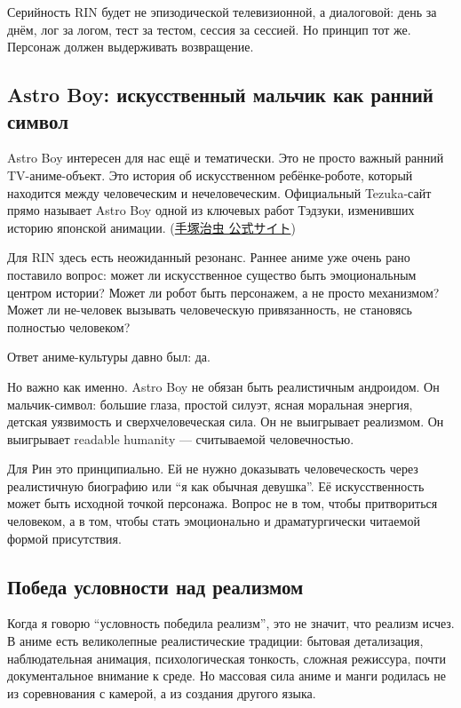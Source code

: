 Серийность RIN будет не эпизодической телевизионной, а диалоговой: день
за днём, лог за логом, тест за тестом, сессия за сессией. Но принцип тот
же. Персонаж должен выдерживать возвращение.

\subsection*{Astro Boy: искусственный мальчик как ранний символ}

Astro Boy интересен для нас ещё и тематически. Это не просто важный
ранний TV-аниме-объект. Это история об искусственном ребёнке-роботе,
который находится между человеческим и нечеловеческим. Официальный
Tezuka-сайт прямо называет Astro Boy одной из ключевых работ Тэдзуки,
изменивших историю японской анимации.
(\href{https://tezukaosamu.net/en/anime/30.html?utm_source=chatgpt.com}{手塚治虫
公式サイト})

Для RIN здесь есть неожиданный резонанс. Раннее аниме уже очень рано
поставило вопрос: может ли искусственное существо быть эмоциональным
центром истории? Может ли робот быть персонажем, а не просто механизмом?
Может ли не-человек вызывать человеческую привязанность, не становясь
полностью человеком?

Ответ аниме-культуры давно был: да.

Но важно как именно. Astro Boy не обязан быть реалистичным андроидом. Он
мальчик-символ: большие глаза, простой силуэт, ясная моральная энергия,
детская уязвимость и сверхчеловеческая сила. Он не выигрывает реализмом.
Он выигрывает readable humanity --- считываемой человечностью.

Для Рин это принципиально. Ей не нужно доказывать человеческость через
реалистичную биографию или ``я как обычная девушка''. Её искусственность
может быть исходной точкой персонажа. Вопрос не в том, чтобы
притвориться человеком, а в том, чтобы стать эмоционально и
драматургически читаемой формой присутствия.

\subsection*{Победа условности над реализмом}

Когда я говорю ``условность победила реализм'', это не значит, что
реализм исчез. В аниме есть великолепные реалистические традиции:
бытовая детализация, наблюдательная анимация, психологическая тонкость,
сложная режиссура, почти документальное внимание к среде. Но массовая
сила аниме и манги родилась не из соревнования с камерой, а из создания
другого языка.

